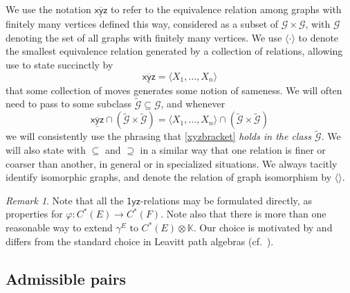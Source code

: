 \documentclass[12pt]{amsbook}%
\renewcommand{\phi}{\varphi}
\theoremstyle{defin}
\theoremstyle{remark}
\newtheorem{remar}[theor]{Remark}
\numberwithin{equation}{chapter}
\numberwithin{theor}{section}
\newcommand{\K}{\mathbb{K}}
\newcommand{\xyz}[1]{\mbox{$\mathsf{#1}$}}
\newcommand{\xyzrel}[1]{\mbox{$\overline{\underline{\mathsf{ #1}}}$}}
\begin{document}
We use the notation $\xyzrel{xyz}$ to refer to the equivalence relation among graphs with finitely many vertices defined this way, considered as a subset of $\mathcal G\times \mathcal G$, with $\mathcal G$ denoting the set of all graphs with finitely many vertices. We use $\langle \cdot \rangle$ to denote the smallest equivalence relation generated by a collection of relations, allowing use to state succinctly by 
\begin{equation}\label{xyzbracket}
\xyzrel{xyz}=\langle X_1,\dots, X_n \rangle
\end{equation}
that some collection of moves generates some notion of sameness. We will often need to pass to some subclass $\widetilde{\mathcal G}\subseteq \mathcal G$, and whenever 
\[
\xyzrel{xyz}\cap (\widetilde{\mathcal G}\times \widetilde{\mathcal G})=\langle X_1,\dots, X_n \rangle\cap (\widetilde{\mathcal G}\times \widetilde{\mathcal G})
\]
we will consistently use the phrasing that \eqref{xyzbracket} \emph{holds in the class $\widetilde{\mathcal G}$}. We will also state with $\subseteq$ and $\supseteq$ in a similar way that one relation is finer or coarser than another, in general or in specialized situations. We always tacitly identify isomorphic graphs, and denote the relation of graph isomorphism by $\langle\rangle$.

\begin{remar}
Note that all the \xyz{1yz}-relations may be formulated directly, as properties for $\phi:C^*(E)\to C^*(F)$.
Note also that there is more than one reasonable way to extend $\gamma^E$ to $C^*(E)\otimes \K$. Our choice is motivated by \cite{tmcjr:dgigc} and differs from the standard choice in Leavitt path algebras (cf.\ \cite{rh:ggclpa}). %
\end{remar}





\subsection{Admissible pairs}\label{adpairs}
\end{document}
